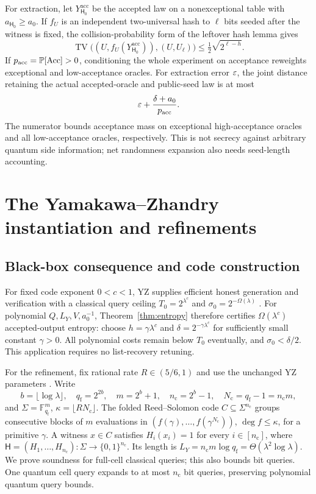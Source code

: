 \documentclass[11pt]{article}
\theoremstyle{definition}\newtheorem{definition}[theorem]{Definition}
\theoremstyle{remark}\newtheorem{remark}[theorem]{Remark}
\DeclareMathOperator{\TV}{TV}\DeclareMathOperator{\FC}{FC}
\begin{document}
For extraction, let \(Y^{\mathrm{acc}}_{\mathsf H_0}\) be the accepted law on a nonexceptional table with \(a_{\mathsf H_0}\ge a_0\). If \(f_U\) is an independent two-universal hash to \(\ell\) bits seeded after the witness is fixed, the collision-probability form of the leftover hash lemma gives
\[
 \TV\bigl((U,f_U(Y^{\mathrm{acc}}_{\mathsf H_0})),(U,U_\ell)\bigr)\le\tfrac12\sqrt{2^{\ell-h}}.
\]
If \(p_{\mathrm{acc}}=\mathbb P[\mathrm{Acc}]>0\), conditioning the whole experiment on acceptance reweights exceptional and low-acceptance oracles. For extraction error \(\varepsilon\), the joint distance retaining the actual accepted-oracle and public-seed law is at most
\[
 \varepsilon+\frac{\delta+a_0}{p_{\mathrm{acc}}}.
\]
The numerator bounds acceptance mass on exceptional high-acceptance oracles and all low-acceptance oracles, respectively. This is not secrecy against arbitrary quantum side information; net randomness expansion also needs seed-length accounting.

\section{The Yamakawa--Zhandry instantiation and refinements}\label{sec:yz}
\subsection{Black-box consequence and code construction}
For fixed code exponent \(0<c<1\), YZ supplies efficient honest generation and verification with a classical query ceiling \(T_0=2^{\lambda^c}\) and \(\sigma_0=2^{-\Omega(\lambda)}\) \cite[Lemmas~6.3 and~6.9]{YZ24}. For polynomial \(Q,L_Y,V,a_0^{-1}\), Theorem~\ref{thm:entropy} therefore certifies \(\Omega(\lambda^c)\) accepted-output entropy: choose \(h=\gamma\lambda^c\) and \(\delta=2^{-\gamma\lambda^c}\) for sufficiently small constant \(\gamma>0\). All polynomial costs remain below \(T_0\) eventually, and \(\sigma_0<\delta/2\). This application requires no list-recovery retuning.

For the refinement, fix rational rate \(R\in(5/6,1)\) and use the unchanged YZ parameters \cite[Section~4.3.2]{YZ24}. Write
\[
 b=\lfloor\log\lambda\rfloor,\quad q_{\mathrm f}=2^{2b},\quad m=2^b+1,\quad n_{\mathrm c}=2^b-1,\quad N_{\mathrm c}=q_{\mathrm f}-1=n_{\mathrm c}m,
\]
and \(\Sigma=\mathbb F_{q_{\mathrm f}}^m\), \(\kappa=\lfloor RN_{\mathrm c}\rfloor\). The folded Reed--Solomon code \(C\subseteq\Sigma^{n_{\mathrm c}}\) groups consecutive blocks of \(m\) evaluations in \((f(\gamma),\ldots,f(\gamma^{N_{\mathrm c}}))\), \(\deg f\le\kappa\), for a primitive \(\gamma\). A witness \(x\in C\) satisfies \(H_i(x_i)=1\) for every \(i\in[n_{\mathrm c}]\), where \(\mathsf H=(H_1,\ldots,H_{n_{\mathrm c}}):\Sigma\to\{0,1\}^{n_{\mathrm c}}\). Its length is \(L_Y=n_{\mathrm c}m\log q_{\mathrm f}=\Theta(\lambda^2\log\lambda)\). We prove soundness for full-cell classical queries; this also bounds bit queries. One quantum cell query expands to at most \(n_{\mathrm c}\) bit queries, preserving polynomial quantum query bounds.
\end{document}
